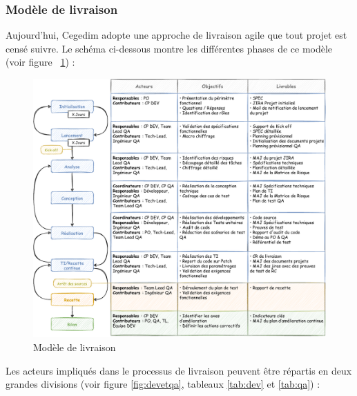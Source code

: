 \subsubsection{Modèle de livraison}
Aujourd'hui, Cegedim adopte une approche de livraison agile que tout projet est censé suivre. Le schéma ci-dessous montre les différentes phases de ce modèle (voir figure  ~\ref{fig:delivery}) :
\begin{figure}[H]
    \begin{center}
        \includegraphics[width=\linewidth]{images/sec3/deliveryprocess.pdf}
        \caption{Modèle de livraison}
        \label{fig:delivery}
    \end{center}
\end{figure}
Les acteurs impliqués dans le processus de livraison peuvent être répartis en deux grandes divisions (voir figure \ref{fig:devetqa}, tableaux \ref{tab:dev} et \ref{tab:qa}) :
